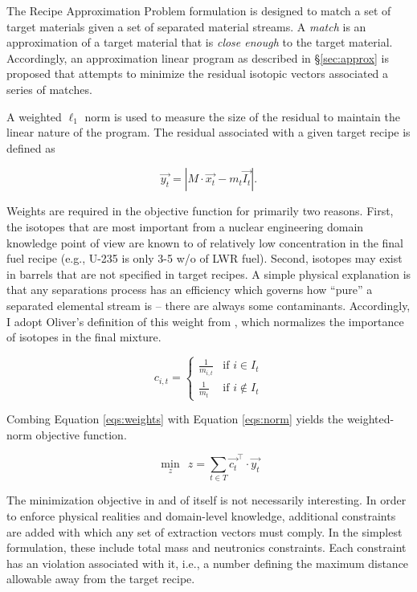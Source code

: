 The Recipe Approximation Problem formulation is designed to match a set of
target materials given a set of separated material streams. A \textit{match} is
an approximation of a target material that is \textit{close enough} to the
target material. Accordingly, an approximation linear program as described
in \S\ref{sec:approx} is proposed that attempts to minimize the residual
isotopic vectors associated a series of matches. 

A weighted $\ell_1$ norm is used to measure the size of the residual to maintain the
linear nature of the program. The residual associated with a given target recipe
is defined as

\begin{equation}\label{eqs:norm}
\vec{y_{t}} = \left| M \cdot \vec{x_{t}}  - m_t \vec{I_{t}} \right|.
\end{equation}

Weights are required in the objective function for primarily two reasons. First,
the isotopes that are most important from a nuclear engineering domain knowledge
point of view are known to of relatively low concentration in the final fuel
recipe (e.g., U-235 is only 3-5 w/o of LWR fuel). Second, isotopes may exist in
barrels that are not specified in target recipes. A simple physical explanation
is that any separations process has an efficiency which governs how ``pure'' a
separated elemental stream is -- there are always some
contaminants. Accordingly, I adopt Oliver's definition of this weight from
\cite{oliver_geniusv2:_2009}, which normalizes the importance of isotopes in the
final mixture.

\begin{equation}\label{eqs:weights}
c_{i,t} = 
\begin{cases}
 \frac{1}{m_{i,t}} & \text{if } i \in I_{t} \\
 \frac{1}{m_{t}}   & \text{if } i \not\in I_{t}
\end{cases}
\end{equation}

Combing Equation \ref{eqs:weights} with Equation \ref{eqs:norm} yields the
weighted-norm objective function.

\begin{equation}\label{rap-obj}
\min_{z} \:\: z = \sum_{t \in T} \vec{c_{t}}^{\top} \cdot \vec{y_{t}}
\end{equation}

The minimization objective in and of itself is not necessarily interesting. In
order to enforce physical realities and domain-level knowledge, additional
constraints are added with which any set of extraction vectors must comply. In
the simplest formulation, these include total mass and neutronics
constraints. Each constraint has an violation associated with it, i.e., a number
defining the maximum distance allowable away from the target recipe. 


